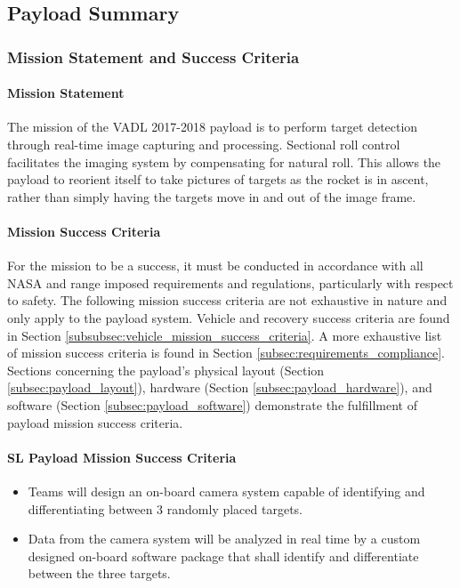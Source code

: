 \documentclass[class=article, crop=false]{standalone}
\begin{document}
	\subsection{Payload Summary}
	\label{subsec:payload_summary}
	\subsubsection{Mission Statement and Success Criteria}
	\paragraph{Mission Statement}
	The mission of the VADL 2017-2018 payload is to perform target detection through real-time image capturing and processing. Sectional roll control facilitates the imaging system by compensating for natural roll. This allows the payload to reorient itself to take pictures of targets as the rocket is in ascent, rather than simply having the targets move in and out of the image frame.
	
	\paragraph{Mission Success Criteria}
	For the mission to be a success, it must be conducted in accordance with all NASA and range imposed requirements and regulations, particularly with respect to safety. The following mission success criteria are not exhaustive in nature and only apply to the payload system. Vehicle and recovery success criteria are found in Section \ref{subsubsec:vehicle_mission_success_criteria}. A more exhaustive list of mission success criteria is found in Section \ref{subsec:requirements_compliance}. Sections concerning the payload's physical layout (Section \ref{subsec:payload_layout}), hardware (Section \ref{subsec:payload_hardware}), and software (Section \ref{subsec:payload_software}) demonstrate the fulfillment of payload mission success criteria.
	
	\paragraph{SL Payload Mission Success Criteria} 
	\begin{itemize}
		\item Teams will design an on-board camera system capable of identifying and differentiating between 3 randomly placed targets.
		\item Data from the camera system will be analyzed in real time by a custom designed on-board software package that shall identify and differentiate between the three targets.
		
	\end{itemize}
	
\end{document}
